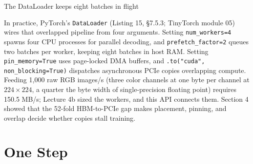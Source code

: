 \documentclass[aspectratio=169, 12pt]{beamer}
\begin{document}
\begin{frame}{The DataLoader keeps eight batches in flight}
{    In practice, PyTorch's \texttt{DataLoader} (Listing 15, \S7.5.3; TinyTorch module 05) wires that overlapped pipeline from four arguments. Setting \texttt{num\_workers=4} spawns four CPU processes for parallel decoding, and \texttt{prefetch\_factor=2} queues two batches per worker, keeping eight batches in host RAM. Setting \texttt{pin\_memory=True} uses page-locked DMA buffers, and \texttt{.to("cuda", non\_blocking=True)} dispatches asynchronous PCIe copies overlapping compute. Feeding 1,000 raw RGB images/s (three color channels at one byte per channel at $224 \times 224$, a quarter the byte width of single-precision floating point) requires 150.5 MB/s; Lecture 4b sized the workers, and this API connects them. Section 4 showed that the 52-fold HBM-to-PCIe gap makes placement, pinning, and overlap decide whether copies stall training.



  }
\end{frame}

\section{One Step}
\end{document}
